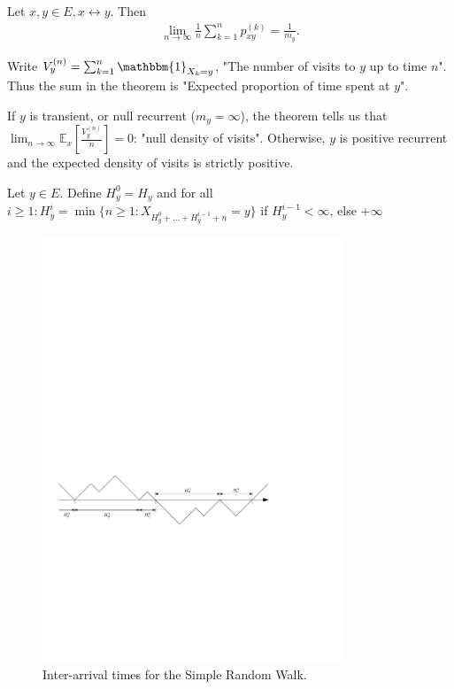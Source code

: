 \begin{theorem}[]
	Let $x,y \in E, x \leftrightarrow y$. Then 
	\begin{align}
	\boxed{\lim_{n \to \infty}\frac{1}{n}\sum_{k=1}^{n} p_{xy}^{(k)}=\frac{1}{m_{y}}}
	.\end{align}
\end{theorem}
\begin{rmk}[]
	Write $V_{y}^{(n)}=\sum_{k=1}^{n} \mathbbm{1}_{X_k=y}$, "The number of visits to $y$ up to time $n$". Thus the sum in the theorem is "Expected proportion of time spent at $y$".
\end{rmk}

If $y$ is transient, or null recurrent ($m_y=\infty$), the theorem tells us that $\lim_{n \to \infty}\mathbb{E}_{x} \left[ \frac{V_y^{(n)}}{n} \right] =0$: "null density of visits". Otherwise, $y$ is positive recurrent and the expected density of visits is strictly positive.

\begin{defn}
	Let $y \in E$. Define $H_y^{0}=H_y$ and for all $i\geq 1: H_{y}^{i}= \min\{n \geq 1: X_{H_y^0 +  \ldots  + H_y^{i-1}+n}=y\}$ if $H_y^{i-1}<\infty$, else $+\infty$	
\end{defn}
\begin{figure}[h!]
	\centering
	\includegraphics[width=0.8\textwidth]{figures/inter_arrival.pdf}
	\caption{Inter-arrival times for the Simple Random Walk.}
\end{figure}


